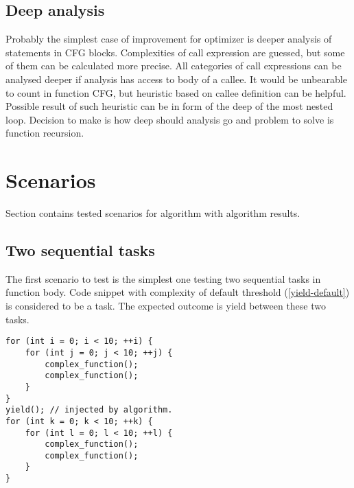 \subsection{Deep analysis}
Probably the simplest case of improvement for optimizer is deeper analysis of statements in CFG blocks. Complexities of call expression are guessed, but some of them can be calculated more precise. All categories of call expressions can be analysed deeper if analysis has access to body of a callee. It would be unbearable to count in function CFG, but heuristic based on callee definition can be helpful. Possible result of such heuristic can be in form of the deep of the most nested loop. Decision to make is how deep should analysis go and problem to solve is function recursion.

\section{Scenarios}
Section contains tested scenarios for algorithm with algorithm results.

\subsection{Two sequential tasks}
The first scenario to test is the simplest one testing two sequential tasks in function body. Code snippet with complexity of default threshold (\ref{yield-default}) is considered to be a task. The expected outcome is yield between these two tasks.

\begin{lstlisting}[caption={The first scenario with two sequential \textit{tasks}.}]
for (int i = 0; i < 10; ++i) {
    for (int j = 0; j < 10; ++j) {
        complex_function();
        complex_function();
    }
}
yield(); // injected by algorithm.
for (int k = 0; k < 10; ++k) {
    for (int l = 0; l < 10; ++l) {
        complex_function();
        complex_function();
    }
}
\end{lstlisting}

